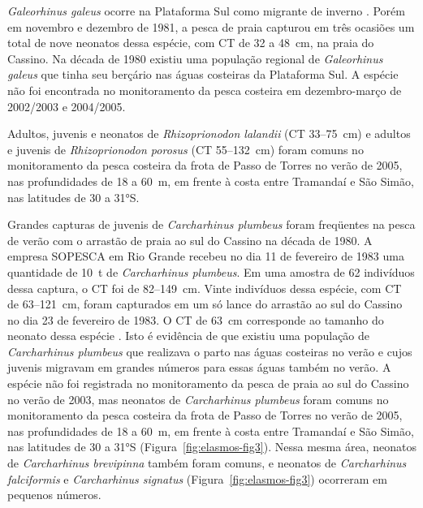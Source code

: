 \documentclass[a4paper,11pt,twoside,showtrims,onecolumn,openright,final]{memoir}
\begin{document}

\emph{Galeorhinus galeus} ocorre na Plataforma Sul como migrante de inverno \citep{vooren1997}. %
Porém em novembro e dezembro de 1981, a pesca de praia capturou em três ocasiões um total de nove 
neonatos dessa espécie, com CT de 32 a 48~cm, na praia do Cassino. Na década de 1980 existiu uma 
população regional de \emph{Galeorhinus galeus} que tinha seu berçário nas águas costeiras da Plataforma Sul. 
A espécie não foi encontrada no monitoramento da pesca costeira em dezembro-março de 2002/2003 e 2004/2005.

Adultos, juvenis e neonatos de \emph{Rhizoprionodon lalandii} (CT 33--75~cm) e adultos e juvenis 
de \emph{Rhizoprionodon porosus} (CT 55--132~cm) foram comuns no monitoramento da pesca costeira da frota 
de Passo de Torres no verão de 2005, nas profundidades de 18 a 60~m, em frente à costa entre Tramandaí 
e São Simão, nas latitudes de 30 a 31°S.

Grandes capturas de juvenis de \emph{Carcharhinus plumbeus} foram freqüentes na pesca de verão com o arrastão de praia 
ao sul do Cassino na década de 1980. A empresa SOPESCA em Rio Grande recebeu no dia 11 de fevereiro de 1983
uma quantidade de 10~t de \emph{Carcharhinus plumbeus}. Em uma amostra de 62 indivíduos dessa captura, 
o CT foi de 82--149~cm. Vinte indivíduos dessa espécie, com CT de 63--121~cm, foram capturados em um só lance 
do arrastão ao sul do Cassino no dia 23 de fevereiro de 1983. O CT de 63~cm corresponde ao tamanho do 
neonato dessa espécie \citep{COMPAGNO1984B}. %
Isto é evidência de que existiu uma população de \emph{Carcharhinus plumbeus} que realizava o parto nas 
águas costeiras no verão e cujos juvenis migravam em grandes números para essas águas também no verão. 
A espécie não foi registrada no monitoramento da pesca de praia ao sul do Cassino no verão de 2003, 
mas neonatos de \emph{Carcharhinus plumbeus} foram comuns no monitoramento da pesca costeira da frota 
de Passo de Torres no verão de 2005, nas profundidades de 18 a 60~m, em frente à costa entre Tramandaí 
e São Simão, nas latitudes de 30 a 31°S (Figura~\ref{fig:elasmos-fig3}). %
Nessa mesma área, neonatos de \emph{Carcharhinus brevipinna} também foram comuns, e neonatos 
de \emph{Carcharhinus falciformis} e \emph{Carcharhinus signatus} (Figura~\ref{fig:elasmos-fig3}) %
ocorreram em pequenos números.
\end{document}
